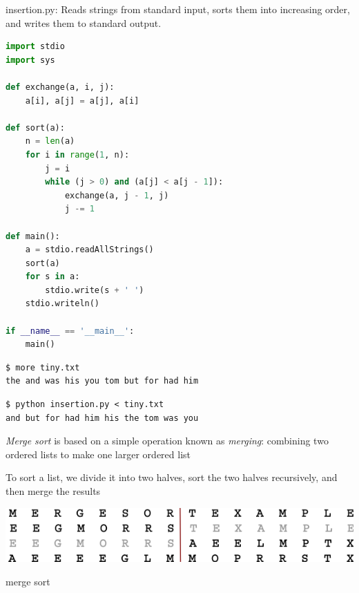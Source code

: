 \documentclass[8pt,a4paper,compress,handout]{beamer}
\begin{document}
\begin{frame}[fragile]
\begin{framed}
\tiny insertion.py: Reads strings from standard input, sorts them into increasing order, and writes them to standard output.
\end{framed}

\begin{lstlisting}[language=Python]
import stdio
import sys

def exchange(a, i, j):
    a[i], a[j] = a[j], a[i]

def sort(a):
    n = len(a)
    for i in range(1, n):
        j = i
        while (j > 0) and (a[j] < a[j - 1]):
            exchange(a, j - 1, j)
            j -= 1

def main():
    a = stdio.readAllStrings()
    sort(a)
    for s in a:
        stdio.write(s + ' ')
    stdio.writeln()

if __name__ == '__main__':
    main()
\end{lstlisting}

\begin{lstlisting}[language={}]
$ more tiny.txt 
the and was his you tom but for had him
\end{lstlisting}

\begin{lstlisting}[language={}]
$ python insertion.py < tiny.txt 
and but for had him his the tom was you 
\end{lstlisting}
\end{frame}

\begin{frame}[fragile]
\emph{Merge sort} is based on a simple operation known as \emph{merging}: combining two ordered lists to make one larger ordered list

\bigskip

To sort a list, we divide it into two halves, sort the two halves recursively, and then merge the results

\begin{center}
\includegraphics[scale=0.3]{figures/merge.png}

\smallskip

\tiny merge sort
\end{center}
\end{frame}
\end{document}
